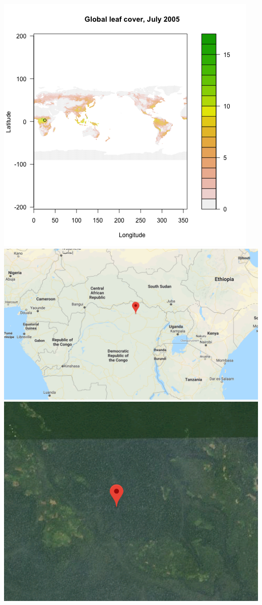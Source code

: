 \documentclass[11pt]{article}
\begin{document}
\includegraphics[width=\textwidth]{../img/LAI_global_t0.png}
\includegraphics[width=\textwidth]{../img/google_maps.png}
\includegraphics[width=\textwidth]{../img/google_maps_sat.png}
\end{document}
